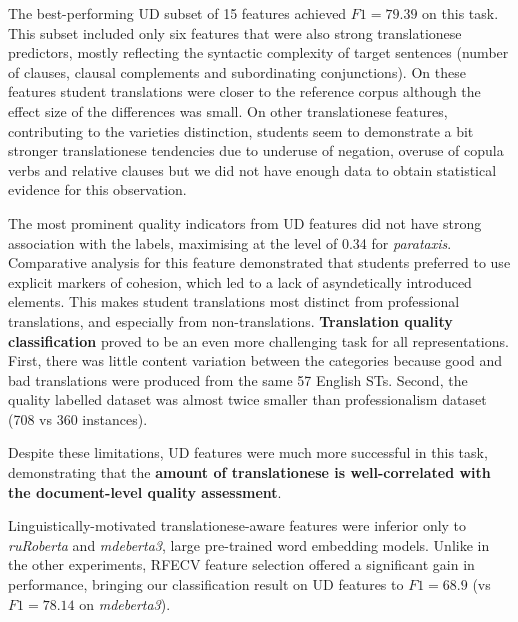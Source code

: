 The best-performing UD subset of 15 features achieved $F1=79.39$ on this task. This subset included only six features that were also strong translationese predictors, mostly reflecting the syntactic complexity of target sentences (number of clauses, clausal complements and subordinating conjunctions). On these features student translations were closer to the reference corpus although the effect size of the differences was small. On other translationese features, contributing to the varieties distinction, students seem to demonstrate a bit stronger translationese tendencies due to underuse of negation, overuse of copula verbs and relative clauses but we did not have enough data to obtain statistical evidence for this observation. 

The most prominent quality indicators from UD features did not have strong association with the labels, maximising at the level of 0.34 for \textit{parataxis}. Comparative analysis for this feature demonstrated that students preferred to use explicit markers of cohesion, which led to a lack of asyndetically introduced elements. This makes student translations most distinct from professional translations, and especially from non-translations.
\textbf{Translation quality classification} proved to be an even more challenging task for all representations. First, there was little content variation between the categories because good and bad translations were produced from the same 57 English STs. Second, the quality labelled dataset was almost twice smaller than professionalism dataset (708 vs 360 instances). %

Despite these limitations, UD features were much more successful in this task, demonstrating that the \textbf{amount of translationese is well-correlated with the document-level quality assessment}. 

\label{pg:translationese_indicators_work_for_binary_labels}
Linguistically-motivated translationese-aware features were inferior only to \textit{ruRoberta} and \textit{mdeberta3}, large pre-trained word embedding models. Unlike in the other experiments, RFECV feature selection offered a significant gain in performance, bringing our classification result on UD features to $F1=68.9$ (vs $F1=78.14$ on \textit{mdeberta3}).

